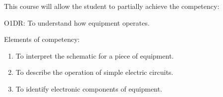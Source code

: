 {This course will allow the student to partially achieve the competency:

O1DR:  To understand how equipment operates.

Elements of competency:
\begin{enumerate}
\item To interpret the schematic for a piece of equipment.
\item To describe the operation of simple electric circuits.
\item To identify electronic components of equipment.
\end{enumerate}
\smallskip

}
